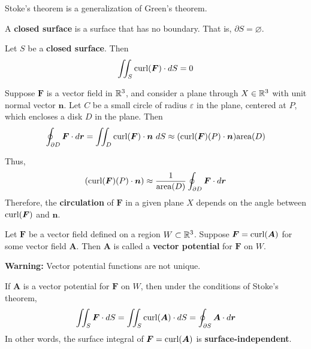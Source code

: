     \begin{example}
    Stoke's theorem is a generalization of Green's theorem.    
    \end{example}

\begin{definition}
        A \textbf{closed surface} is a surface that has no boundary.  That is, $\partial S = \varnothing$.
    \end{definition}

\begin{corollary}
    Let $S$ be a \textbf{closed surface}.  Then $$\iint_S \textnormal{curl}(\bm{F}) \cdot dS = 0$$
    \end{corollary}

\begin{corollary}
    Suppose $\bm{F}$ is a vector field in $\mathbb{R}^3$, and consider a plane through $X \in \mathbb{R}^3$ with unit normal vector $\bm{n}$.  Let $C$ be a small circle of radius $\varepsilon$ in the plane, centered at $P$, which encloses a disk $D$ in the plane. Then
    $$\oint_{\partial D} \bm{F} \cdot d\bm{r} = \iint_D \textnormal{curl}(\bm{F}) \cdot \bm{n} \ dS \approx (\textnormal{curl}(\bm{F})(P) \cdot \bm{n}) \textnormal{area}(D)$$

    Thus, $$(\textnormal{curl}(\bm{F})(P) \cdot \bm{n}) \approx \frac{1}{\textnormal{area}(D)}\oint_{\partial D} \bm{F} \cdot d\bm{r}$$
    Therefore, the \textbf{circulation} of $\bm{F}$ in a given plane $X$ depends on the angle between $\textnormal{curl}(\bm{F})$ and $\bm{n}$.
    \end{corollary}


\begin{definition}Let $\bm{F}$ be a vector field defined on a region $W \subset \mathbb{R}^3$. Suppose $\bm{F} = \textnormal{curl}(\bm{A})$ for some vector field $\bm{A}$.  Then $\bm{A}$ is called a \textbf{vector potential} for $\bm{F}$ on $W$.
    \end{definition}
    
    
    \begin{remark}
    \textbf{Warning:} Vector potential functions are not unique.  
    \end{remark}


\begin{remark}
    If $\bm{A}$ is a vector potential for $\bm{F}$ on $W$, then under the conditions of Stoke's theorem,
    $$\iint_S \bm{F} \cdot dS = \iint_S \textnormal{curl}(\bm{A}) \cdot dS = \oint_{\partial S} \bm{A} \cdot d\bm{r}$$
    In other words, the surface integral of $\bm{F} = \textnormal{curl}(\bm{A})$ is \textbf{surface-independent}.
    \end{remark}


